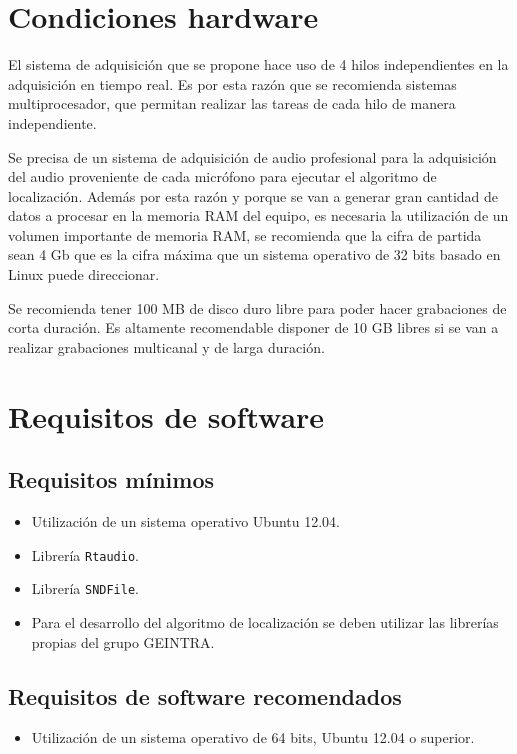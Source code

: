 \section{Condiciones hardware}

El sistema de adquisición que se propone hace uso de 4 hilos independientes en la adquisición en tiempo real. Es por esta razón que se recomienda sistemas multiprocesador, que permitan realizar las tareas de cada hilo de manera independiente.

Se precisa de un sistema de adquisición de audio profesional para la adquisición del audio proveniente de cada micrófono para ejecutar el algoritmo de localización. Además por esta razón y porque se van a generar gran cantidad de datos a procesar en la memoria RAM del equipo, es necesaria la utilización de un volumen importante de memoria RAM, se recomienda que la cifra de partida sean 4 Gb que es la cifra máxima que un sistema operativo de 32 bits basado en Linux puede direccionar.

Se recomienda tener 100 MB de disco duro libre para poder hacer grabaciones de corta duración. Es altamente recomendable disponer de 10 GB libres si se van a realizar grabaciones multicanal y de larga duración.
 
\section{Requisitos de software}

\subsection{Requisitos mínimos}
\begin{itemize}
  \item Utilización de un sistema operativo Ubuntu 12.04.
  \item Librería \texttt{Rtaudio}.
  \item Librería \texttt{SNDFile}.
  \item Para el desarrollo del algoritmo de localización se deben utilizar las librerías propias del grupo GEINTRA.
\end{itemize}

\subsection{Requisitos de software recomendados}
\begin{itemize}
  \item Utilización de un sistema operativo de 64 bits, Ubuntu 12.04 o superior.
\end{itemize}

